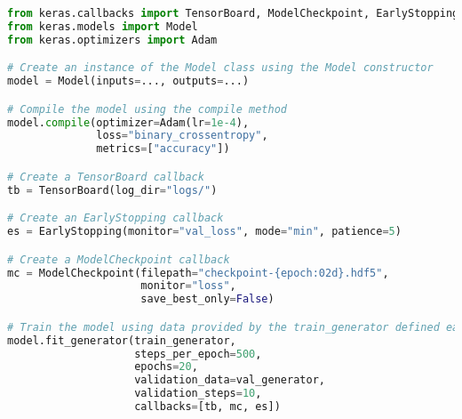 \begin{lstlisting}[float={ht},caption={A simple example of compiling a Keras model using the \texttt{TensorBoard}, \texttt{EarlyStopping}, and \texttt{ModelCheckpoint} callbacks. The Keras implementations of the Adam optimiser, binary cross-entropy loss, and per-pixel accuracy are used. Once the model is compiled, it is then trained for 20 epochs using the \texttt{fit\_generator} method.},label={lst:compile},language=Python,upquote=true]
from keras.callbacks import TensorBoard, ModelCheckpoint, EarlyStopping
from keras.models import Model
from keras.optimizers import Adam

# Create an instance of the Model class using the Model constructor
model = Model(inputs=..., outputs=...)

# Compile the model using the compile method
model.compile(optimizer=Adam(lr=1e-4), 
              loss="binary_crossentropy",
              metrics=["accuracy"])

# Create a TensorBoard callback
tb = TensorBoard(log_dir="logs/")

# Create an EarlyStopping callback
es = EarlyStopping(monitor="val_loss", mode="min", patience=5)

# Create a ModelCheckpoint callback
mc = ModelCheckpoint(filepath="checkpoint-{epoch:02d}.hdf5",
                     monitor="loss",
                     save_best_only=False)

# Train the model using data provided by the train_generator defined earlier
model.fit_generator(train_generator, 
                    steps_per_epoch=500, 
                    epochs=20,
                    validation_data=val_generator,
                    validation_steps=10,
                    callbacks=[tb, mc, es])
\end{lstlisting}